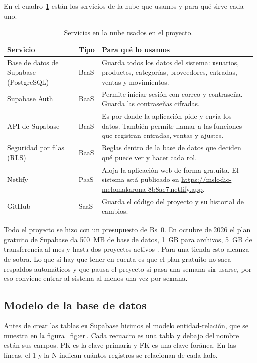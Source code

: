 \documentclass[12pt,a4paper]{article}
\begin{document}
En el cuadro~\ref{tab:servicios} están los servicios de la nube que usamos y para qué sirve cada uno.

\begin{table}[!htbp]
\centering
\small
\renewcommand{\arraystretch}{1.25}
\begin{tabularx}{\textwidth}{>{\raggedright\arraybackslash}p{3.4cm} >{\raggedright\arraybackslash}p{1.4cm} >{\raggedright\arraybackslash}X}
\toprule
\textbf{Servicio} & \textbf{Tipo} & \textbf{Para qué lo usamos} \\
\midrule
Base de datos de Supabase (PostgreSQL) & BaaS & Guarda todos los datos del sistema: usuarios, productos, categorías, proveedores, entradas, ventas y movimientos. \\
Supabase Auth & BaaS & Permite iniciar sesión con correo y contraseña. Guarda las contraseñas cifradas. \\
API de Supabase & BaaS & Es por donde la aplicación pide y envía los datos. También permite llamar a las funciones que registran entradas, ventas y ajustes. \\
Seguridad por filas (RLS) & BaaS & Reglas dentro de la base de datos que deciden qué puede ver y hacer cada rol. \\
Netlify & PaaS & Aloja la aplicación web de forma gratuita. El sistema está publicado en \url{https://melodic-melomakarona-8b8ae7.netlify.app}. \\
GitHub & SaaS & Guarda el código del proyecto y su historial de cambios. \\
\bottomrule
\end{tabularx}
\caption{Servicios en la nube usados en el proyecto.}
\label{tab:servicios}
\end{table}

Todo el proyecto se hizo con un presupuesto de Bs~0. En octubre de 2026 el plan gratuito de Supabase da 500~MB de base de datos, 1~GB para archivos, 5~GB de transferencia al mes y hasta dos proyectos activos \cite{supabasedocs}. Para una tienda esto alcanza de sobra. Lo que sí hay que tener en cuenta es que el plan gratuito no saca respaldos automáticos y que pausa el proyecto si pasa una semana sin usarse, por eso conviene entrar al sistema al menos una vez por semana.

\subsection{Modelo de la base de datos}

Antes de crear las tablas en Supabase hicimos el modelo entidad-relación, que se muestra en la figura~\ref{fig:er}. Cada recuadro es una tabla y debajo del nombre están sus campos. PK es la clave primaria y FK es una clave foránea. En las líneas, el 1 y la N indican cuántos registros se relacionan de cada lado.
\end{document}
